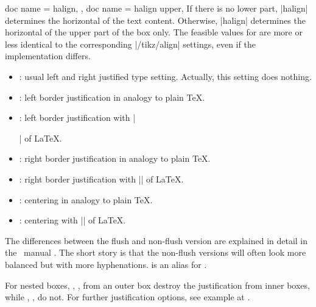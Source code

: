 \begin{docTcbKeys}[
    doc parameter   = {=\meta{alignment}},
    doc description = {no default, initially \texttt{justify}},
    doc new         = 2015-05-07,
  ]
  {
    {
      doc name = halign,
    },
    {
      doc name = halign upper,
    }
  }
  If there is no lower part, |halign| determines the horizontal 
  of the text content.
  Otherwise, |halign| determines the horizontal 
  of the upper part of the box only.
  The feasible values for  are more or less identical to
  the corresponding |/tikz/align| settings, even if the implementation differs.
  \begin{itemize}
  \item{}: usual left and right justified type setting.
    Actually, this setting does nothing.
  \item{}: left border justification in analogy to plain \TeX.
  \item{}: left border justification with |\raggedright| of \LaTeX.
  \item{}: right border justification in analogy to plain \TeX.
  \item{}: right border justification with |\raggedleft| of \LaTeX.
  \item{}: centering in analogy to plain \TeX.
  \item{}: centering with |\centering| of \LaTeX.
  \end{itemize}
  The differences between the flush and non-flush version are explained in
  detail in the \tikzname\ manual \cite{tantau:tikz_and_pgf}. The short story is that
  the non-flush versions will often look more balanced but with more
  hyphenations.
   is an alias for .

\enlargethispage*{10mm}
\begin{marker}
For nested boxes, , ,  from an outer box
destroy the justification  from inner boxes, while
, , 
do not. For further justification options, see example at  .
\end{marker}


\end{docTcbKeys}
